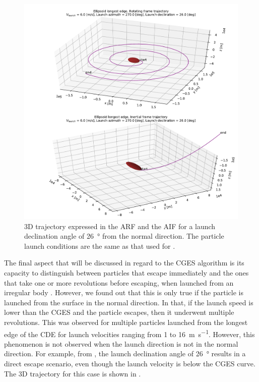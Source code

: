 \begin{figure}[htb]
\centering
\captionsetup{justification=centering}
\includegraphics[width=\textwidth, height=0.55\textheight, keepaspectratio=true]{non_conservative_escape_speed/directEscape_3D_trajectory_declination26.pdf}
\caption{3D trajectory expressed in the \gls{ARF} and the \gls{AIF} for a launch declination angle of \SI{26}{\degree} from the normal direction. The particle launch conditions are the same as that used for \protect{}.}
\label{fig:3d_traj_declination_26}
\end{figure}
\FloatBarrier
The final aspect that will be discussed in regard to the \gls{CGES} algorithm is its capacity to distinguish between particles that escape immediately and the ones that take one or more revolutions before escaping, when launched from an irregular body \parencite{scheeres2002fate}. However, we found out that this is only true if the particle is launched from the surface in the normal direction. In that, if the launch speed is lower than the \gls{CGES} and the particle escapes, then it underwent multiple revolutions. This was observed for multiple particles launched from the longest edge of the \gls{CDE} for launch velocities ranging from 1 to \SI{16}{\metre \per \second}. However, this phenomenon is not observed when the launch direction is not in the normal direction. For example, from , the launch declination angle of \SI{26}{\degree} results in a direct escape scenario, even though the launch velocity is below the \gls{CGES} curve. The 3D trajectory for this case is shown in .
